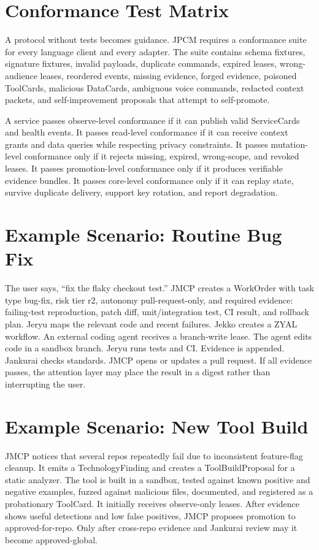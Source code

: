\documentclass[10pt,journal,onecolumn]{IEEEtran}
\begin{document}
\section{Conformance Test Matrix}
A protocol without tests becomes guidance. JPCM requires a conformance suite for every language client and every adapter. The suite contains schema fixtures, signature fixtures, invalid payloads, duplicate commands, expired leases, wrong-audience leases, reordered events, missing evidence, forged evidence, poisoned ToolCards, malicious DataCards, ambiguous voice commands, redacted context packets, and self-improvement proposals that attempt to self-promote.

A service passes observe-level conformance if it can publish valid ServiceCards and health events. It passes read-level conformance if it can receive context grants and data queries while respecting privacy constraints. It passes mutation-level conformance only if it rejects missing, expired, wrong-scope, and revoked leases. It passes promotion-level conformance only if it produces verifiable evidence bundles. It passes core-level conformance only if it can replay state, survive duplicate delivery, support key rotation, and report degradation.

\section{Example Scenario: Routine Bug Fix}
The user says, ``fix the flaky checkout test.'' JMCP creates a WorkOrder with task type bug-fix, risk tier r2, autonomy pull-request-only, and required evidence: failing-test reproduction, patch diff, unit/integration test, CI result, and rollback plan. Jeryu maps the relevant code and recent failures. Jekko creates a ZYAL workflow. An external coding agent receives a branch-write lease. The agent edits code in a sandbox branch. Jeryu runs tests and CI. Evidence is appended. Jankurai checks standards. JMCP opens or updates a pull request. If all evidence passes, the attention layer may place the result in a digest rather than interrupting the user.

\section{Example Scenario: New Tool Build}
JMCP notices that several repos repeatedly fail due to inconsistent feature-flag cleanup. It emits a TechnologyFinding and creates a ToolBuildProposal for a static analyzer. The tool is built in a sandbox, tested against known positive and negative examples, fuzzed against malicious files, documented, and registered as a probationary ToolCard. It initially receives observe-only leases. After evidence shows useful detections and low false positives, JMCP proposes promotion to approved-for-repo. Only after cross-repo evidence and Jankurai review may it become approved-global.
\end{document}
